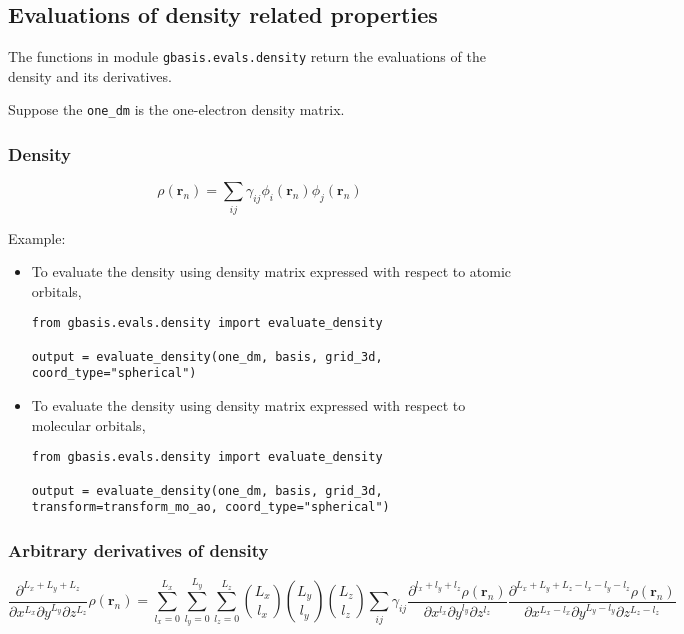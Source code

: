 \documentclass[letterpaper]{article}
\begin{document}
\subsection{Evaluations of density related properties}
The functions in module \verb|gbasis.evals.density| return the evaluations of the
density and its derivatives.

Suppose the \verb|one_dm| is the one-electron density matrix.
\subsubsection{Density}
\begin{equation}
  \rho(\mathbf{r}_n) = \sum_{ij} \gamma_{ij} \phi_i(\mathbf{r}_n) \phi_j(\mathbf{r}_n)
\end{equation}

Example:
\begin{itemize}
\item To evaluate the density using density matrix expressed with respect to
  atomic orbitals,
  \begin{lstlisting}[xleftmargin=-25pt]
from gbasis.evals.density import evaluate_density

output = evaluate_density(one_dm, basis, grid_3d, coord_type="spherical")
\end{lstlisting}
\item To evaluate the density using density matrix expressed with respect to
  molecular orbitals,
  \begin{lstlisting}[xleftmargin=-25pt]
from gbasis.evals.density import evaluate_density

output = evaluate_density(one_dm, basis, grid_3d, transform=transform_mo_ao, coord_type="spherical")
\end{lstlisting}
\end{itemize}
\subsubsection{Arbitrary derivatives of density}
\begin{equation}
  \frac{\partial^{L_x + L_y + L_z}}{\partial x^{L_x} \partial y^{L_y} \partial z^{L_z}}
  \rho(\mathbf{r}_n)
  =
  \sum_{l_x=0}^{L_x} \sum_{l_y=0}^{L_y} \sum_{l_z=0}^{L_z}
  \binom{L_x}{l_x} \binom{L_y}{l_y} \binom{L_z}{l_z}
  \sum_{ij} \gamma_{ij}
  \frac{\partial^{l_x + l_y + l_z} \rho(\mathbf{r}_n)}{\partial x^{l_x} \partial y^{l_y} \partial z^{l_z}}
  \frac{
    \partial^{L_x + L_y + L_z - l_x - l_y - l_z} \rho(\mathbf{r}_n)
  }{
    \partial x^{L_x - l_x} \partial y^{L_y - l_y} \partial z^{L_z - l_z}
  }
\end{equation}
\end{document}
